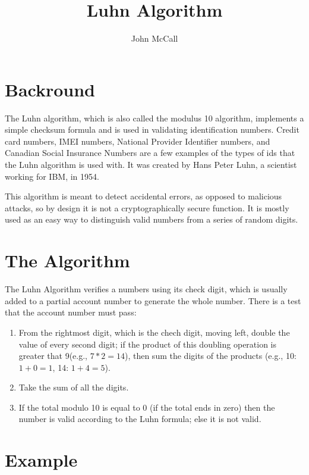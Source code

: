\documentclass{article}
\title{Luhn Algorithm}
\author{John McCall}
\begin{document}
\maketitle

\section{Backround}
The Luhn algorithm, which is also called the modulus 10 algorithm, implements a simple
checksum formula and is used in validating identification numbers. Credit card numbers, IMEI
numbers, National Provider Identifier numbers, and Canadian Social Insurance Numbers are a
few examples of the types of ids that the Luhn algorithm is used with. It was created by
Hans Peter Luhn, a scientist working for IBM, in 1954.

This algorithm is meant to detect accidental errors, as opposed to malicious attacks, so by
design it is not a cryptographically secure function. It is mostly used as an easy way to
distinguish valid numbers from a series of random digits.

\section{The Algorithm}
The Luhn Algorithm verifies a numbers using its check digit, which is usually
added to a partial account number to generate the whole number. There is a
test that the account number must pass:

\begin{enumerate}

\item From the rightmost digit, which is the chech digit, moving left, double
the value of every second digit; if the product of this doubling operation is
greater that 9(e.g., $7*2=14$), then sum the digits of the products (e.g., 10: 
$1+0=1$, 14: $1+4=5$).

\item Take the sum of all the digits.

\item If the total modulo 10 is equal to 0 (if the total ends in zero) then the
number is valid according to the Luhn formula; else it is not valid.

\end{enumerate}

\section{Example}
\end{document}
